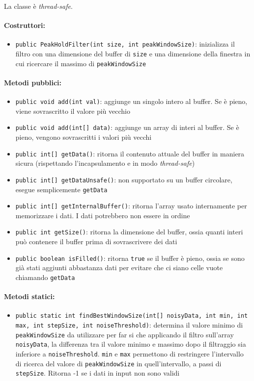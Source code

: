 La classe è \textit{thread-safe}.

\paragraph{Costruttori:}\begin{itemize}
	\item \texttt{public PeakHoldFilter(int size, int peakWindowSize)}: inizializza il filtro con una dimensione del buffer di \texttt{size} e una dimensione della finestra in cui ricercare il massimo di \texttt{peakWindowSize}
\end{itemize}

\paragraph{Metodi pubblici:}\begin{itemize}
	\item \texttt{public void add(int val)}: aggiunge un singolo intero al buffer. Se è pieno, viene sovrascritto il valore più vecchio
	\item \texttt{public void add(int[] data)}: aggiunge un array di interi al buffer. Se è pieno, vengono sovrascritti i valori più vecchi
	\item \texttt{public int[] getData()}: ritorna il contenuto attuale del buffer in maniera sicura (rispettando l'incapsulamento e in modo \textit{thread-safe})
	\item \texttt{public int[] getDataUnsafe()}: non supportato su un buffer circolare, esegue semplicemente \texttt{getData}
	\item \texttt{public int[] getInternalBuffer()}: ritorna l'array usato internamente per memorizzare i dati. I dati potrebbero non essere in ordine
	\item \texttt{public int getSize()}: ritorna la dimensione del buffer, ossia quanti interi può contenere il buffer prima di sovrascrivere dei dati
	\item \texttt{public boolean isFilled()}: ritorna \texttt{true} se il buffer è pieno, ossia se sono già stati aggiunti abbastanza dati per evitare che ci siano celle vuote chiamando \texttt{getData}
\end{itemize}

\paragraph{Metodi statici:}\begin{itemize}
	\item \texttt{public static int findBestWindowSize(int[] noisyData, int min, int max, int stepSize, int noiseThreshold)}: determina il valore minimo di \texttt{peakWindowSize} da utilizzare per far si che applicando il filtro sull'array \texttt{noisyData}, la differenza tra il valore minimo e massimo dopo il filtraggio sia inferiore a \texttt{noiseThreshold}. \texttt{min} e \texttt{max} permettono di restringere l'intervallo di ricerca del valore di \texttt{peakWindowSize} in quell'intervallo, a passi di \texttt{stepSize}. Ritorna -1 se i dati in input non sono validi
\end{itemize}

